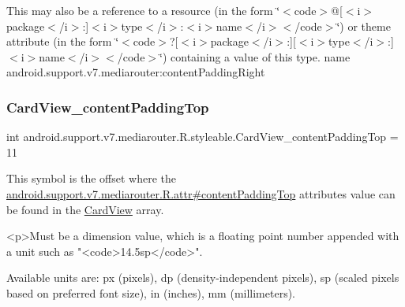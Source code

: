 This may also be a reference to a resource (in the form \char`\"{}$<$code$>$@\mbox{[}$<$i$>$package$<$/i$>$\+:\mbox{]}$<$i$>$type$<$/i$>$\+:$<$i$>$name$<$/i$>$$<$/code$>$\char`\"{}) or theme attribute (in the form \char`\"{}$<$code$>$?\mbox{[}$<$i$>$package$<$/i$>$\+:\mbox{]}\mbox{[}$<$i$>$type$<$/i$>$\+:\mbox{]}$<$i$>$name$<$/i$>$$<$/code$>$\char`\"{}) containing a value of this type.  name android.\+support.\+v7.\+mediarouter\+:content\+Padding\+Right \mbox{\label{classandroid_1_1support_1_1v7_1_1mediarouter_1_1R_1_1styleable_a408aeb6a61417fdcead372dc44eb7d99}} 
\subsubsection{\texorpdfstring{Card\+View\+\_\+content\+Padding\+Top}{CardView\_contentPaddingTop}}
{\footnotesize\ttfamily int android.\+support.\+v7.\+mediarouter.\+R.\+styleable.\+Card\+View\+\_\+content\+Padding\+Top = 11\hspace{0.3cm}{\ttfamily [static]}}

This symbol is the offset where the \hyperlink{classandroid_1_1support_1_1v7_1_1mediarouter_1_1R_1_1attr_a612977c1ba0bac751e77b8512e53743a}{android.\+support.\+v7.\+mediarouter.\+R.\+attr\#content\+Padding\+Top} attribute\textquotesingle{}s value can be found in the \hyperlink{classandroid_1_1support_1_1v7_1_1mediarouter_1_1R_1_1styleable_a58720bc744e6374c25e81b8ae15a2c6a}{Card\+View} array.

\begin{DoxyVerb}      <p>Must be a dimension value, which is a floating point number appended with a unit such as "<code>14.5sp</code>".
\end{DoxyVerb}
 Available units are\+: px (pixels), dp (density-\/independent pixels), sp (scaled pixels based on preferred font size), in (inches), mm (millimeters). 

